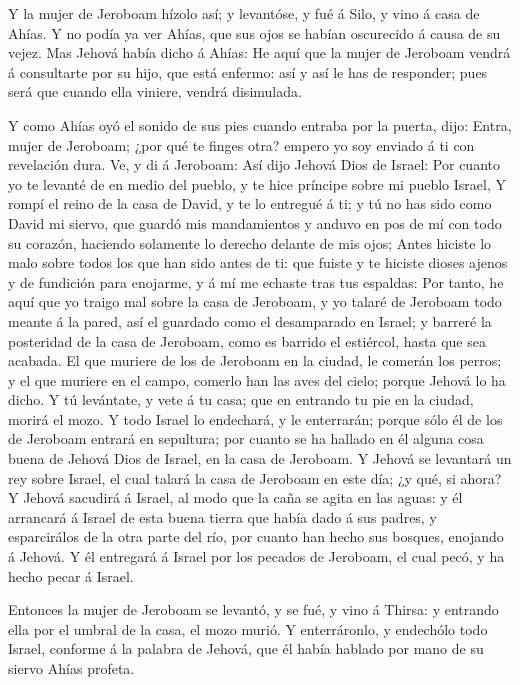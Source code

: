  Y la mujer de Jeroboam hízolo así; y levantóse, y fué á
Silo, y vino á casa de Ahías. Y no podía ya ver Ahías, que sus ojos se
habían oscurecido á causa de su vejez.  Mas Jehová había
dicho á Ahías: He aquí que la mujer de Jeroboam vendrá á consultarte por
su hijo, que está enfermo: así y así le has de responder; pues será que
cuando ella viniere, vendrá disimulada.

 Y como Ahías oyó el sonido de sus pies cuando entraba por
la puerta, dijo: Entra, mujer de Jeroboam; ¿por qué te finges otra?
empero yo soy enviado á ti con revelación dura.  Ve, y di á
Jeroboam: Así dijo Jehová Dios de Israel: Por cuanto yo te levanté de en
medio del pueblo, y te hice príncipe sobre mi pueblo Israel,
 Y rompí el reino de la casa de David, y te lo entregué á
ti; y tú no has sido como David mi siervo, que guardó mis mandamientos y
anduvo en pos de mí con todo su corazón, haciendo solamente lo derecho
delante de mis ojos;  Antes hiciste lo malo sobre todos los
que han sido antes de ti: que fuiste y te hiciste dioses ajenos y de
fundición para enojarme, y á mí me echaste tras tus espaldas:
 Por tanto, he aquí que yo traigo mal sobre la casa de
Jeroboam, y yo talaré de Jeroboam todo meante á la pared, así el
guardado como el desamparado en Israel; y barreré la posteridad de la
casa de Jeroboam, como es barrido el estiércol, hasta que sea acabada.
 El que muriere de los de Jeroboam en la ciudad, le comerán
los perros; y el que muriere en el campo, comerlo han las aves del
cielo; porque Jehová lo ha dicho.  Y tú levántate, y vete á
tu casa; que en entrando tu pie en la ciudad, morirá el mozo.
 Y todo Israel lo endechará, y le enterrarán; porque sólo
él de los de Jeroboam entrará en sepultura; por cuanto se ha hallado en
él alguna cosa buena de Jehová Dios de Israel, en la casa de Jeroboam.
 Y Jehová se levantará un rey sobre Israel, el cual talará
la casa de Jeroboam en este día; ¿y qué, si ahora?  Y
Jehová sacudirá á Israel, al modo que la caña se agita en las aguas: y
él arrancará á Israel de esta buena tierra que había dado á sus padres,
y esparcirálos de la otra parte del río, por cuanto han hecho sus
bosques, enojando á Jehová.  Y él entregará á Israel por
los pecados de Jeroboam, el cual pecó, y ha hecho pecar á Israel.

 Entonces la mujer de Jeroboam se levantó, y se fué, y vino
á Thirsa: y entrando ella por el umbral de la casa, el mozo murió.
 Y enterráronlo, y endechólo todo Israel, conforme á la
palabra de Jehová, que él había hablado por mano de su siervo Ahías
profeta.

